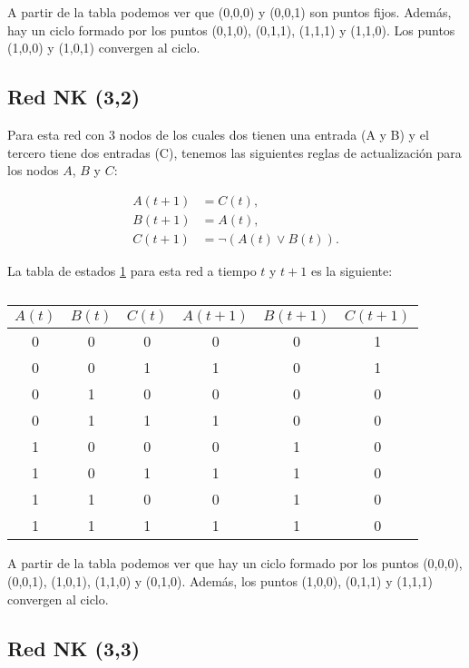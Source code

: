 \documentclass[letterpaper,12pt]{article}
\theoremstyle{plain}
\begin{document}
A partir de la tabla podemos ver que (0,0,0) y (0,0,1) son puntos fijos. Además, hay un ciclo formado por los puntos (0,1,0), (0,1,1), (1,1,1) y (1,1,0). Los puntos (1,0,0) y (1,0,1) convergen al ciclo. 

\subsection*{Red NK (3,2)}

Para esta red con 3 nodos de los cuales dos tienen una entrada (A y B) y el tercero tiene dos entradas (C), tenemos las siguientes reglas de actualización para los nodos $A$, $B$ y $C$:

\begin{align}
    A(t+1) &= C(t), \\
    B(t+1) &= A(t), \\
    C(t+1) &= \lnot (A(t) \lor B(t)). 
\end{align}

La tabla de estados \ref*{tab:2} para esta red a tiempo $t$ y $t+1$ es la siguiente:

\begin{table}[h]
    \centering
    \begin{tabular}{|c|c|c|c|c|c|}
        \hline
        $A(t)$ & $B(t)$ & $C(t)$ & $A(t+1)$ & $B(t+1)$ & $C(t+1)$ \\
        \hline
        0 & 0 & 0 & 0 & 0 & 1  \\
        0 & 0 & 1 & 1 & 0 & 1  \\
        0 & 1 & 0 & 0 & 0 & 0 \\
        0 & 1 & 1 & 1 & 0 & 0  \\
        1 & 0 & 0 & 0 & 1 & 0  \\
        1 & 0 & 1 & 1 & 1 & 0  \\
        1 & 1 & 0 & 0 & 1 & 0  \\
        1 & 1 & 1 & 1 & 1 & 0  \\
        \hline
\end{tabular}
\caption{}
\label{tab:2}
\end{table}

A partir de la tabla podemos ver que hay un ciclo formado por los puntos (0,0,0), (0,0,1), (1,0,1), (1,1,0) y (0,1,0). Además, los puntos (1,0,0), (0,1,1) y (1,1,1) convergen al ciclo. 

\subsection*{Red NK (3,3)}
\end{document}
